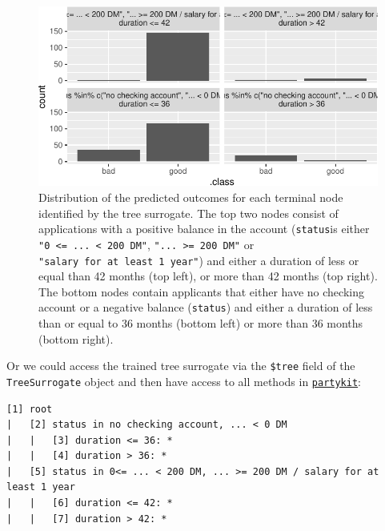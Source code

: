 \begin{figure}[H]

{\centering \includegraphics[width=1\textwidth,height=\textheight]{chapters/chapter12/model_interpretation_files/figure-pdf/fig-iml-surro-1.pdf}

}

\caption{\label{fig-iml-surro}Distribution of the predicted outcomes for
each terminal node identified by the tree surrogate. The top two nodes
consist of applications with a positive balance in the account
(\texttt{status}is either
\texttt{"0\ \textless{}=\ ...\ \textless{}\ 200\ DM"},
\texttt{"...\ \textgreater{}=\ 200\ DM"} or
\texttt{"salary\ for\ at\ least\ 1\ year"}) and either a duration of
less or equal than 42 months (top left), or more than 42 months (top
right). The bottom nodes contain applicants that either have no checking
account or a negative balance (\texttt{status}) and either a duration of
less than or equal to 36 months (bottom left) or more than 36 months
(bottom right).}

\end{figure}

Or we could access the trained tree surrogate via the \texttt{\$tree}
field of the \texttt{TreeSurrogate} object and then have access to all
methods in
\href{https://cran.r-project.org/package=partykit}{\texttt{partykit}}:

\begin{Shaded}
\begin{Highlighting}[]
\SpecialCharTok{::}\SpecialCharTok{$}
\end{Highlighting}
\end{Shaded}

\begin{verbatim}
[1] root
|   [2] status in no checking account, ... < 0 DM
|   |   [3] duration <= 36: *
|   |   [4] duration > 36: *
|   [5] status in 0<= ... < 200 DM, ... >= 200 DM / salary for at least 1 year
|   |   [6] duration <= 42: *
|   |   [7] duration > 42: *
\end{verbatim}

